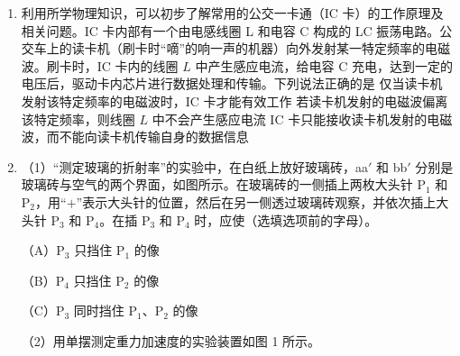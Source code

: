 \documentclass[\gkver]{gaokaozhenti}
\begin{document}
\begin{enumerate}
\item
利用所学物理知识，可以初步了解常用的公交一卡通（IC 卡）的工作原理及相关问题。IC 卡内部有一个由电感线圈 L 和电容 C 构成的 LC 振荡电路。公交车上的读卡机（刷卡时“嘀”的响一声的机器）向外发射某一特定频率的电磁波。刷卡时，IC 卡内的线圈 $L$ 中产生感应电流，给电容 C 充电，达到一定的电压后，驱动卡内芯片进行数据处理和传输。下列说法正确的是
{仅当读卡机发射该特定频率的电磁波时，IC 卡才能有效工作}
{若读卡机发射的电磁波偏离该特定频率，则线圈 $L$ 中不会产生感应电流}
{IC 卡只能接收读卡机发射的电磁波，而不能向读卡机传输自身的数据信息}

\item
（1）“测定玻璃的折射率”的实验中，在白纸上放好玻璃砖，aa$'$ 和 bb$'$ 分别是玻璃砖与空气的两个界面，如图所示。在玻璃砖的一侧插上两枚大头针 P$_{1}$ 和 P$_{2}$，用“$+$”表示大头针的位置，然后在另一侧透过玻璃砖观察，并依次插上大头针 P$_{3}$ 和 P$_{4}$。在插 P$_{3}$ 和 P$_{4}$ 时，应使（选填选项前的字母）。

（A）P$_{3}$ 只挡住 P$_{1}$ 的像

（B）P$_{4}$ 只挡住 P$_{2}$ 的像

（C）P$_{3}$ 同时挡住 P$_{1}$、P$_{2}$ 的像


（2）用单摆测定重力加速度的实验装置如图 1 所示。

\end{enumerate}
\end{document}
